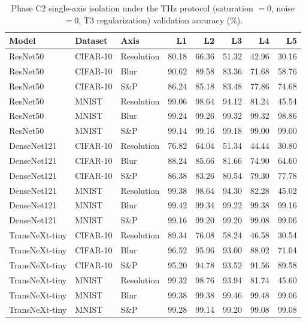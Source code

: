 \begin{table}[htbp]
\centering
\caption{Phase C2 single-axis isolation under the THz protocol (saturation $=0$, noise $=0$, T3 regularization) validation accuracy (\%).}
\label{tab:phase_c2}
\setlength{\tabcolsep}{4pt}
\renewcommand{\arraystretch}{1.1}
\begin{tabular}{lllrrrrr}
\toprule
Model & Dataset & Axis & L1 & L2 & L3 & L4 & L5 \\
\midrule
ResNet50 & CIFAR-10 & Resolution & 80.18 & 66.36 & 51.32 & 42.96 & 30.16 \\
ResNet50 & CIFAR-10 & Blur & 90.62 & 89.58 & 83.36 & 71.68 & 58.76 \\
ResNet50 & CIFAR-10 & S\&P & 86.24 & 85.18 & 83.48 & 77.86 & 74.68 \\
ResNet50 & MNIST & Resolution & 99.06 & 98.64 & 94.12 & 81.24 & 45.54 \\
ResNet50 & MNIST & Blur & 99.24 & 99.26 & 99.32 & 99.32 & 98.86 \\
ResNet50 & MNIST & S\&P & 99.14 & 99.16 & 99.18 & 99.00 & 99.00 \\
DenseNet121 & CIFAR-10 & Resolution & 76.82 & 64.04 & 51.34 & 44.44 & 30.80 \\
DenseNet121 & CIFAR-10 & Blur & 88.24 & 85.66 & 81.66 & 74.90 & 64.60 \\
DenseNet121 & CIFAR-10 & S\&P & 86.38 & 83.26 & 80.54 & 79.30 & 77.78 \\
DenseNet121 & MNIST & Resolution & 99.38 & 98.64 & 94.30 & 82.28 & 45.02 \\
DenseNet121 & MNIST & Blur & 99.42 & 99.34 & 99.22 & 99.38 & 99.16 \\
DenseNet121 & MNIST & S\&P & 99.16 & 99.20 & 99.20 & 99.08 & 99.06 \\
TransNeXt-tiny & CIFAR-10 & Resolution & 89.34 & 76.08 & 58.24 & 46.58 & 30.54 \\
TransNeXt-tiny & CIFAR-10 & Blur & 96.52 & 95.96 & 93.00 & 88.02 & 71.04 \\
TransNeXt-tiny & CIFAR-10 & S\&P & 95.20 & 94.78 & 93.52 & 91.56 & 89.58 \\
TransNeXt-tiny & MNIST & Resolution & 99.32 & 98.76 & 93.94 & 81.74 & 45.60 \\
TransNeXt-tiny & MNIST & Blur & 99.38 & 99.38 & 99.46 & 99.48 & 99.06 \\
TransNeXt-tiny & MNIST & S\&P & 99.28 & 99.14 & 99.20 & 99.08 & 99.08 \\
\bottomrule
\end{tabular}
\end{table}
